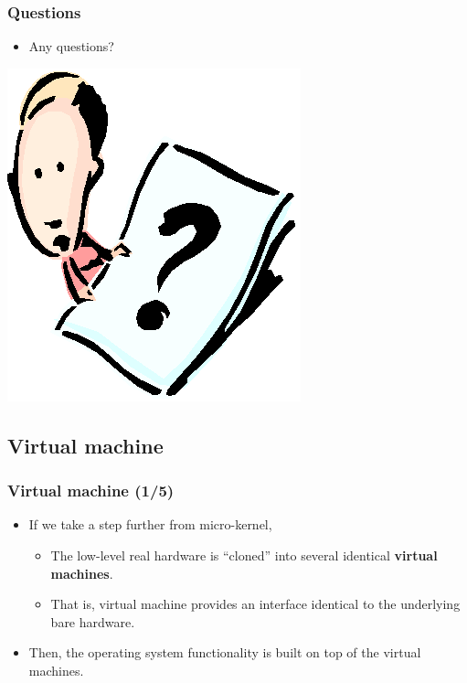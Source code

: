 \documentclass[CJKutf8,xcolor=pdftex,dvipsnames,table]{beamer}
\begin{document}
\begin{CJK*}{UTF8}{song}
  \begin{frame}
    \frametitle{Questions}
    \begin{itemize}
    \item{Any questions?}
    \end{itemize}
    \begin{center}
      \includegraphics[scale=.5]{question}
    \end{center}
  \end{frame}
  
  \subsection{Virtual machine}

  \begin{frame}
    \frametitle{Virtual machine (1/5)} \pause
    \begin{itemize}
    \item{If we take a step further from micro-kernel,} \pause
      \begin{itemize}
      \item{The low-level real hardware is ``cloned'' into several identical \textbf{virtual machines}.} \pause
      \item{That is, virtual machine provides an interface identical to the underlying bare hardware.} \pause
      \end{itemize}
    \item{Then, the operating system functionality is built on top of the virtual machines.}
    \end{itemize}
  \end{frame}
  

\end{CJK*}
\end{document}
